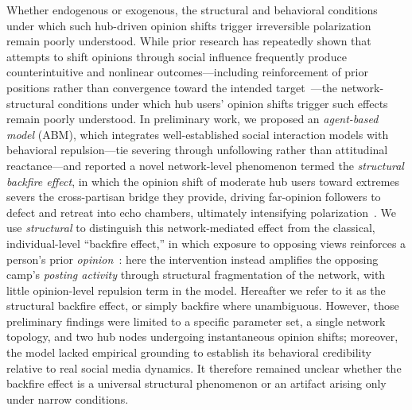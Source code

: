 \documentclass[pdflatex,sn-mathphys-num]{sn-jnl}%
\theoremstyle{thmstyleone}%
\theoremstyle{thmstyletwo}%
\theoremstyle{thmstylethree}%
\begin{document}
Whether endogenous or exogenous, the structural and behavioral conditions under which
such hub-driven opinion shifts trigger irreversible polarization remain poorly understood. 
While prior research has repeatedly shown that attempts to shift opinions 
through social influence frequently produce counterintuitive and nonlinear 
outcomes---including reinforcement of prior positions rather than convergence
toward the intended target~\cite{Brehm1966,Bail2018}---the network-structural conditions under which hub users' opinion shifts trigger such effects remain poorly understood.
In preliminary work, we proposed an {\em agent-based model} (ABM), which integrates well-established
social interaction models with behavioral repulsion---tie severing through
unfollowing rather than attitudinal reactance---and reported a novel
network-level phenomenon termed the {\em structural backfire effect}, in which the opinion
shift of moderate hub users toward extremes severs the cross-partisan bridge they
provide, driving far-opinion followers to defect and retreat into echo chambers,
ultimately intensifying polarization~\cite{Takeda2026}.
We use \emph{structural} to distinguish this network-mediated effect from the
classical, individual-level ``backfire effect,'' in which exposure to opposing
views reinforces a person's prior \emph{opinion}~\cite{Brehm1966,Nyhan2021}:
here the intervention instead amplifies the opposing camp's \emph{posting activity}
through structural fragmentation of the network, with little opinion-level repulsion
term in the model. Hereafter we refer to it as the structural backfire effect, or
simply backfire where unambiguous.
However, those preliminary findings were limited to a specific parameter set,
a single network topology, and two hub nodes undergoing instantaneous opinion shifts;
moreover, the model lacked empirical grounding to establish its behavioral credibility
relative to real social media dynamics.
It therefore remained unclear whether the backfire effect is a universal structural
phenomenon or an artifact arising only under narrow conditions.
\par
\end{document}
